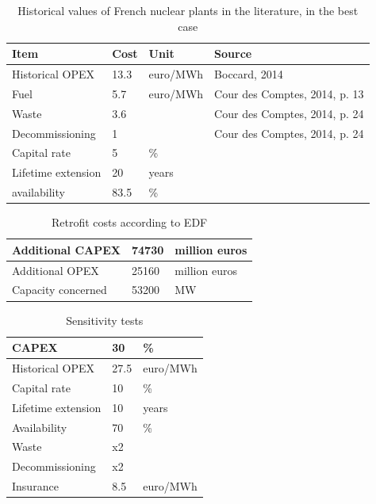 \begin{table}
	\centering
	\caption{Historical values of French nuclear plants in the literature, in the best case}
	\label{tab:historical_costs}
	\begin{tabular}{llll}
		\toprule
		Item & Cost & Unit & Source \\
		\midrule
		Historical OPEX & 13.3 & euro/MWh & Boccard, 2014 \\
		Fuel & 5.7 & euro/MWh & Cour des Comptes, 2014, p. 13 \\
		Waste & 3.6 &  & Cour des Comptes, 2014, p. 24 \\
		Decommissioning & 1 &  & Cour des Comptes, 2014, p. 24 \\
		Capital rate & 5 & \% &  \\
		Lifetime extension & 20 & years & \\
		availability & 83.5 & \% & \\
		\bottomrule
	\end{tabular}
\end{table}


\begin{table}
	\centering
	\caption{Retrofit costs according to EDF}
	\label{tab:costs_grand_carenage}
	\begin{tabular}{lll}
		\toprule
		Additional CAPEX & 74730 & million euros \\
		\midrule
		Additional OPEX & 25160 & million euros \\
		Capacity concerned & 53200 & MW \\
		\bottomrule
	\end{tabular}
\end{table}


\begin{table}
	\centering
	\caption{Sensitivity tests}
	\label{tab:sensitivity_tests}
	\begin{tabular}{lll}
		\toprule
		CAPEX & 30 & \% \\
		\midrule
		Historical OPEX & 27.5 & euro/MWh \\
		Capital rate & 10 & \% \\
		Lifetime extension & 10 & years \\
		Availability & 70 & \% \\
		Waste & x2 &  \\
		Decommissioning & x2 &  \\
		Insurance & 8.5 & euro/MWh \\
		\bottomrule
	\end{tabular}
\end{table}



